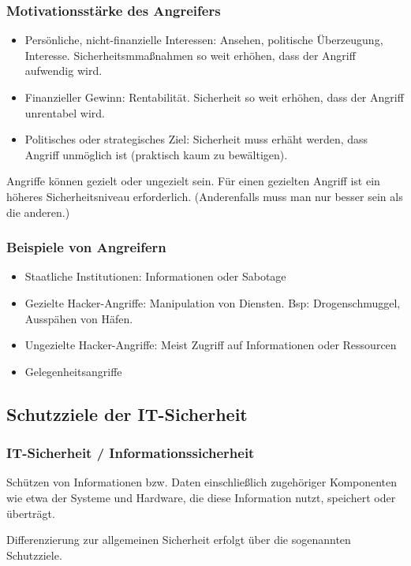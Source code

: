 \subsubsection{Motivationsstärke des Angreifers}
\begin{itemize}
	\item Persönliche, nicht-finanzielle Interessen: Ansehen, politische Überzeugung, Interesse. Sicherheitsmmaßnahmen so weit erhöhen, dass der Angriff aufwendig wird.
	\item Finanzieller Gewinn: Rentabilität. Sicherheit so weit erhöhen, dass der Angriff unrentabel wird.
	\item Politisches oder strategisches Ziel: Sicherheit muss erhäht werden, dass Angriff unmöglich ist (praktisch kaum zu bewältigen).
\end{itemize}

Angriffe können gezielt oder ungezielt sein. Für einen gezielten Angriff ist ein höheres Sicherheitsniveau erforderlich. (Anderenfalls muss man nur besser sein als die anderen.)

\subsubsection{Beispiele von Angreifern}
\begin{itemize}
	\item Staatliche Institutionen: Informationen oder Sabotage
	\item Gezielte Hacker-Angriffe: Manipulation von Diensten. Bsp: Drogenschmuggel, Ausspähen von Häfen.
	\item Ungezielte Hacker-Angriffe: Meist Zugriff auf Informationen oder Ressourcen
	\item Gelegenheitsangriffe
\end{itemize}


\subsection{Schutzziele der IT-Sicherheit}

\subsubsection{IT-Sicherheit / Informationssicherheit}
Schützen von Informationen bzw. Daten einschließlich zugehöriger Komponenten wie etwa der Systeme und Hardware, die diese Information nutzt, speichert oder überträgt.

Differenzierung zur allgemeinen Sicherheit erfolgt über die sogenannten Schutzziele.

